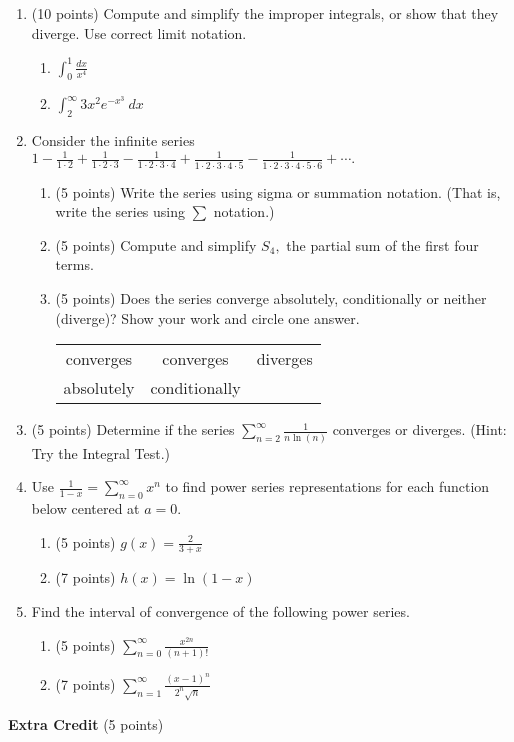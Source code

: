 \documentclass[12pt]{article}
\let\ds\displaystyle
\begin{document}
\newpage
\begin{enumerate}
\item (10 points) Compute and simplify the improper integrals, or show that they diverge. Use correct limit notation.
	\begin{enumerate}
	\item $\ds \int_0^1 \frac{dx}{x^4}$
	\vfill
	\item $\ds \int_2^\infty 3x^2e^{-x^3}\: dx$
	\vfill
	\end{enumerate}

\newpage
\item Consider the infinite series $1-\frac{1}{1\cdot 2}+\frac{1}{1\cdot 2 \cdot 3}-\frac{1}{1\cdot 2 \cdot 3\cdot 4}+\frac{1}{1\cdot 2 \cdot 3\cdot 4\cdot 5}-\frac{1}{1\cdot 2 \cdot 3\cdot 4\cdot 5\cdot 6}+ \cdots.$
	\begin{enumerate}
	\item (5 points) Write the series using sigma or summation notation. (That is, write the series using $\ds \sum $ notation.)
	\vfill
	\item (5 points) Compute and simplify $S_4,$ the partial sum of the first four terms.
	\vfill
	\item (5 points) Does the series converge absolutely, conditionally or neither (diverge)? Show your work and circle one answer. 
	\vfill
\begin{tabular}{ccc}
\quad converges\quad &\quad converges\quad &\quad diverges\quad \\
\quad absolutely\quad&\quad conditionally\quad&\\
\end{tabular}
	\end{enumerate}
\newpage
\item (5 points) Determine if the series $\ds \sum_{n=2}^\infty \frac{1}{n \ln(n)}$ converges or diverges. (Hint: Try the Integral Test.)
\vfill

\item Use $\frac{1}{1-x}=\sum_{n=0}^\infty x^n$ to find power series representations for each function below centered at $a=0.$ 				\begin{enumerate}
	\item (5 points) $g(x)=\frac{2}{3+x}$  
	\vfill
	\item (7 points) $h(x)=\ln(1-x)$
	\vfill
	\end{enumerate}
\item Find the interval of convergence of the following power series.
	\begin{enumerate}
	\item (5 points) $\ds \sum_{n=0}^\infty \frac{x^{2n}}{(n+1)!}$
	\vfill
	\item (7 points) $\ds \sum_{n=1}^\infty \frac{(x-1)^n}{2^n\sqrt{n}}$
	\vfill
	\end{enumerate}
\end{enumerate}
\newpage
\textbf{Extra Credit} (5 points) 
\end{document}
